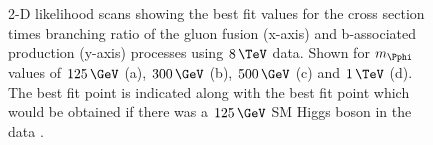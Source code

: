 \begin{figure}[tbh]

\caption[2-D likelihood scans showing the best fit values for the cross section
times branching ratio of the gluon fusion (x-axis) and b-associated production
(y-axis) processes using $8\,\TeV$ data.]{2-D likelihood scans showing the best fit values for the cross section
times branching ratio of the gluon fusion (x-axis) and b-associated production
(y-axis) processes using $8\,\TeV$ data. Shown for $m_{\Pphi}$ values of
$125\,\GeV$ (a), $300\,\GeV$ (b), $500\,\GeV$ (c) and
$1\,\TeV$ (d). The best fit point is indicated along with the best fit
point which would be obtained if there was a $125\,\GeV$ \ac{SM} Higgs boson in the data \cite{HIG-13-021}.}
\label{fig:2Dlikelihood}
\end{figure}

